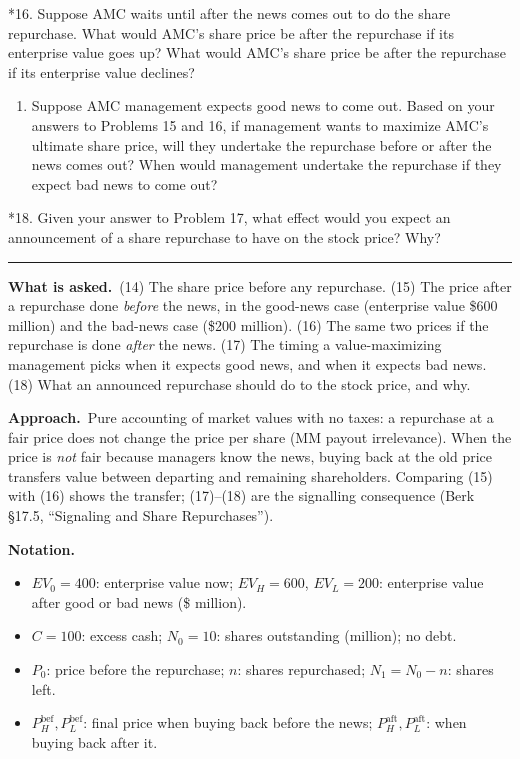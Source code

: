\documentclass[11pt,a4paper]{article}
\newcommand{\notation}{\par\noindent\textbf{Notation.}}
\newcommand{\asked}{\par\medskip\noindent\textbf{What is asked.}~}
\newcommand{\approach}{\par\smallskip\noindent\textbf{Approach.}~}
\providecommand{\tightlist}{\setlength{\itemsep}{0pt}\setlength{\parskip}{0pt}}
\newcommand{\stmtend}{\par\endgroup\nopagebreak\noindent\rule{\linewidth}{0.4pt}\par\medskip}
\begin{document}
*16. Suppose AMC waits until after the news comes out to do the share repurchase. What would AMC's
share price be after the repurchase if its enterprise value goes up? What would AMC's share price be
after the repurchase if its enterprise value declines?

\begin{enumerate}
\def\labelenumi{\arabic{enumi}.}
\setcounter{enumi}{16}
\tightlist
\item
  Suppose AMC management expects good news to come out. Based on your answers to Problems 15 and 16,
  if management wants to maximize AMC's ultimate share price, will they undertake the repurchase
  before or after the news comes out? When would management undertake the repurchase if they expect
  bad news to come out?
\end{enumerate}

*18. Given your answer to Problem 17, what effect would you expect an announcement of a share
repurchase to have on the stock price? Why?
\stmtend

\asked (14) The share price before any repurchase. (15) The price after a repurchase done \emph{before} the news, in the good-news case (enterprise value \$600 million) and the bad-news case (\$200 million). (16) The same two prices if the repurchase is done \emph{after} the news. (17) The timing a value-maximizing management picks when it expects good news, and when it expects bad news. (18) What an announced repurchase should do to the stock price, and why.

\approach Pure accounting of market values with no taxes: a repurchase at a fair price does not change the price per share (MM payout irrelevance). When the price is \emph{not} fair because managers know the news, buying back at the old price transfers value between departing and remaining shareholders. Comparing (15) with (16) shows the transfer; (17)--(18) are the signalling consequence (Berk \S17.5, ``Signaling and Share Repurchases'').

\notation
\begin{itemize}
  \item $EV_0=400$: enterprise value now; $EV_H=600$, $EV_L=200$: enterprise value after good or bad news (\$ million).
  \item $C=100$: excess cash; $N_0=10$: shares outstanding (million); no debt.
  \item $P_0$: price before the repurchase; $n$: shares repurchased; $N_1=N_0-n$: shares left.
  \item $P^{\text{bef}}_H,P^{\text{bef}}_L$: final price when buying back before the news; $P^{\text{aft}}_H,P^{\text{aft}}_L$: when buying back after it.
\end{itemize}
\end{document}

